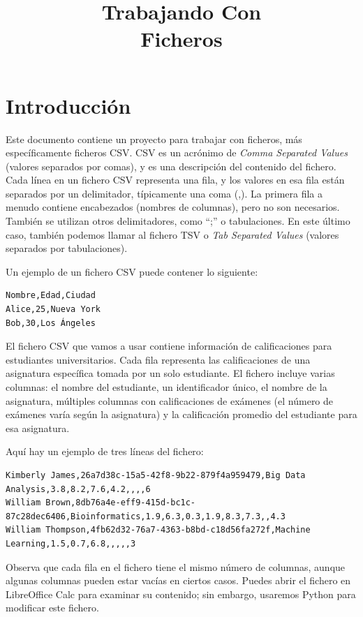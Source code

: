 \documentclass[10pt,a4paper]{article}
\title{Trabajando Con\\{\huge Ficheros}}
\date{}
\begin{document}
\maketitle

\section*{Introducción}
Este documento contiene un proyecto para trabajar con ficheros, más específicamente ficheros CSV. CSV es un acrónimo de \textit{Comma Separated Values} (valores separados por comas), y es una descripción del contenido del fichero. Cada línea en un fichero CSV representa una fila, y los valores en esa fila están separados por un delimitador, típicamente una coma (,). La primera fila a menudo contiene encabezados (nombres de columnas), pero no son necesarios. También se utilizan otros delimitadores, como ``;'' o tabulaciones. En este último caso, también podemos llamar al fichero TSV o \textit{Tab Separated Values} (valores separados por tabulaciones).

Un ejemplo de un fichero CSV puede contener lo siguiente:
\begin{verbatim}
Nombre,Edad,Ciudad
Alice,25,Nueva York
Bob,30,Los Ángeles
\end{verbatim}

El fichero CSV que vamos a usar contiene información de calificaciones para estudiantes universitarios. Cada fila representa las calificaciones de una asignatura específica tomada por un solo estudiante. El fichero incluye varias columnas: el nombre del estudiante, un identificador único, el nombre de la asignatura, múltiples columnas con calificaciones de exámenes (el número de exámenes varía según la asignatura) y la calificación promedio del estudiante para esa asignatura.

Aquí hay un ejemplo de tres líneas del fichero:
\begin{verbatim}
Kimberly James,26a7d38c-15a5-42f8-9b22-879f4a959479,Big Data Analysis,3.8,8.2,7.6,4.2,,,,6
William Brown,8db76a4e-eff9-415d-bc1c-87c28dec6406,Bioinformatics,1.9,6.3,0.3,1.9,8.3,7.3,,4.3
William Thompson,4fb62d32-76a7-4363-b8bd-c18d56fa272f,Machine Learning,1.5,0.7,6.8,,,,,3
\end{verbatim}

Observa que cada fila en el fichero tiene el mismo número de columnas, aunque algunas columnas pueden estar vacías en ciertos casos. Puedes abrir el fichero en LibreOffice Calc para examinar su contenido; sin embargo, usaremos Python para modificar este fichero.
\end{document}
